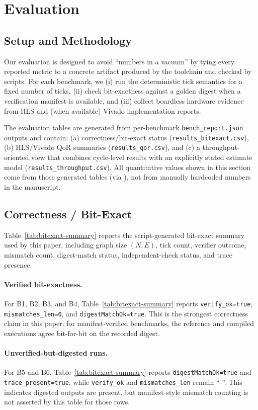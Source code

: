 \section{Evaluation}

\subsection{Setup and Methodology}
Our evaluation is designed to avoid ``numbers in a vacuum'' by tying every reported metric to a concrete artifact produced by the toolchain and checked by scripts. For each benchmark, we (i) run the deterministic tick semantics for a fixed number of ticks, (ii) check bit-exactness against a golden digest when a verification manifest is available, and (iii) collect boardless hardware evidence from HLS and (when available) Vivado implementation reports.

The evaluation tables are generated from per-benchmark \texttt{bench\_report.json} outputs and contain: (a) correctness/bit-exact status (\texttt{results\_bitexact.csv}), (b) HLS/Vivado QoR summaries (\texttt{results\_qor.csv}), and (c) a throughput-oriented view that combines cycle-level results with an explicitly stated estimate model (\texttt{results\_throughput.csv}). All quantitative values shown in this section come from those generated tables (via \texttt{}), not from manually hardcoded numbers in the manuscript.

\subsection{Correctness / Bit-Exact}
Table~\ref{tab:bitexact-summary} reports the script-generated bit-exact summary used by this paper, including graph size $(N,E)$, tick count, verifier outcome, mismatch count, digest-match status, independent-check status, and trace presence.

\paragraph{Verified bit-exactness.}
For B1, B2, B3, and B4, Table~\ref{tab:bitexact-summary} reports \texttt{verify\_ok=true}, \texttt{mismatches\_len=0}, and \texttt{digestMatchOk=true}. This is the strongest correctness claim in this paper: for manifest-verified benchmarks, the reference and compiled executions agree bit-for-bit on the recorded digest.

\paragraph{Unverified-but-digested runs.}
For B5 and B6, Table~\ref{tab:bitexact-summary} reports \texttt{digestMatchOk=true} and \texttt{trace\_present=true}, while \texttt{verify\_ok} and \texttt{mismatches\_len} remain ``-''. This indicates digested outputs are present, but manifest-style mismatch counting is not asserted by this table for those rows.

